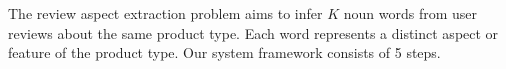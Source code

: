 \documentclass[10pt,final,conference,letterpaper]{IEEEtran}
\begin{document}
The review aspect extraction problem aims to infer $K$ noun 
words from user reviews about the same product type.
Each word represents a distinct aspect or feature of the product type. 
%
Our system framework consists of 5 steps.
%
%
%
%
%
%        
%
%
%
%
%
%
\end{document}
